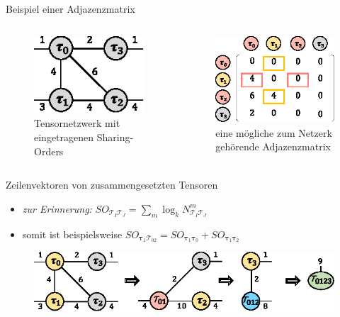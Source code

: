 \documentclass{beamer}
\newcommand{\Tau}{\bm{\mathcal{T}}}
\newcommand{\tauB}{\bm{\tau}}
\begin{document}
\begin{frame}{Beispiel einer Adjazenzmatrix}
	\begin{columns}
		\begin{figure}
			\includegraphics[scale=1.7]{figure_03_a_mid}
			\caption*{Tensornetzwerk mit eingetragenen Sharing-Orders}
		\end{figure}
		\begin{figure}
			\includegraphics[scale=1.3]{figure_05_c}
			\caption*{eine mögliche zum Netzerk gehörende Adjazenzmatrix}
		\end{figure}
	\end{columns}
\end{frame}

\begin{frame}{Zeilenvektoren von zusammengesetzten Tensoren}
	\begin{itemize}
		\item \textit{zur Erinnerung:} $SO_{\Tau_I \Tau_J} = \sum_m \log_k N^m_{\Tau_I \Tau_J}$
		\item somit ist beispielsweise $SO_{\tauB_1 \Tau_{02}} = SO_{\tauB_1 \tauB_0} + SO_{\tauB_1 \tauB_2}$
	\end{itemize} \pause

	\begin{figure}
		\includegraphics{figure_03_b_low}
	\end{figure}
\end{frame}
\end{document}

